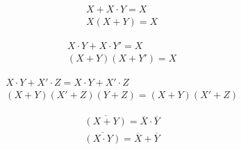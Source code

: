 \documentclass[11pt,fleqn]{book} %
\begin{document}
\begin{theorem}[Cubierta]
\begin{align}
& X+X\cdot Y=X\\
& X(X+Y)=X
\end{align}
\end{theorem}
\begin{theorem}[Combinación]
\begin{align}
& X\cdot Y+X\cdot Y'=X\\
& (X+Y)(X+Y')=X
\end{align}
\end{theorem}
\begin{theorem}[Consenso]
\begin{align}
& X\cdot Y+X'\cdot Z=X\cdot Y+X'\cdot Z\\
& (X+Y)(X'+Z)(Y+Z)=(X+Y)(X'+Z)
\end{align}
\end{theorem}
\begin{theorem}[DeMorgan]
\begin{align}
& \overline{(X+Y)}=\overline{X}\cdot\overline{Y}\\
& \overline{(X\cdot Y)}=\overline{X}+\overline{Y}
\end{align}
\end{theorem}
\end{document}
